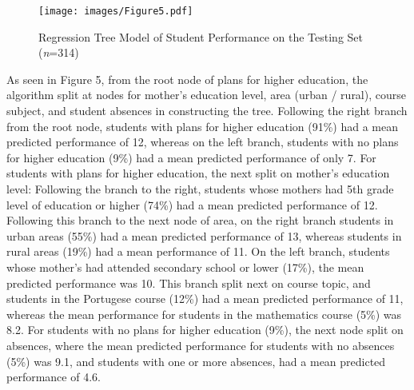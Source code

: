 \documentclass[sigconf]{acmart}
\begin{document}
\begin{figure}[!ht]
  \centering\texttt{[image: images/Figure5.pdf]}
  \caption{Regression Tree Model of Student Performance on the
  Testing Set (\textit{n}=314)}
  \label{f:Figure5}
\end{figure}

As seen in Figure 5, from the root node of plans for higher education, the 
algorithm split at nodes for mother's education level, area (urban / rural),
course subject, and student absences in constructing the tree. Following 
the right branch from the root node, students with plans for higher education 
(91\%) had a mean predicted performance of 12, whereas on the left branch, 
students with no plans for higher education (9\%) had a mean predicted
performance of only 7. For students with plans for higher education, the next 
split on mother's education level: Following the branch to the right, students 
whose mothers had 5th grade level of education or higher (74\%) had a mean 
predicted performance of 12. Following this branch to the next node of area, 
on the right branch students in urban areas (55\%) had a mean predicted
performance of 13, whereas students in rural areas (19\%) had a mean 
performance of 11. On the left branch, students whose mother's had attended 
secondary school or lower (17\%), the mean predicted performance was 10. This 
branch split next on course topic, and students in the Portugese course (12\%) 
had a mean predicted performance of 11, whereas the mean performance for 
students in the mathematics course (5\%) was 8.2. For students with no plans 
for higher education (9\%), the next node split on absences, where the mean 
predicted performance for students with no absences (5\%) was 9.1, and students 
with one or more absences, had a mean predicted performance of 4.6. 

\end{document}
